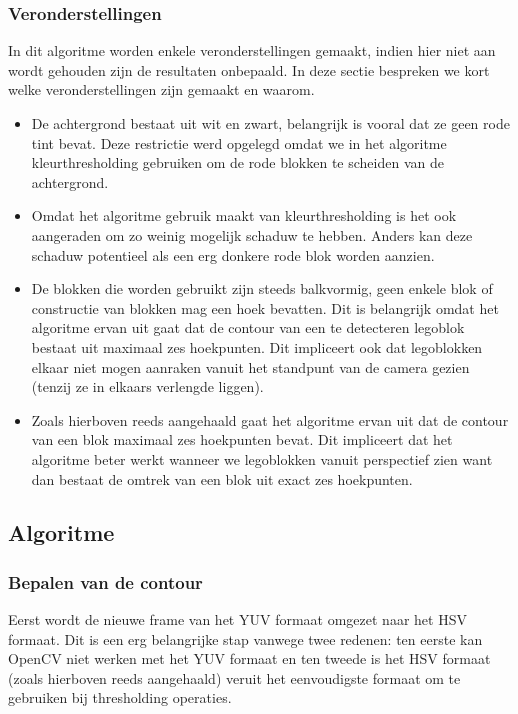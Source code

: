 \subsubsection*{Veronderstellingen}
In dit algoritme worden enkele veronderstellingen gemaakt, indien hier niet aan wordt gehouden zijn de resultaten onbepaald. In deze sectie bespreken we kort welke veronderstellingen zijn gemaakt en waarom.

\begin{itemize}
\item De achtergrond bestaat uit wit en zwart, belangrijk is vooral dat ze geen rode tint bevat. Deze restrictie werd opgelegd omdat we in het algoritme kleurthresholding gebruiken om de rode blokken te scheiden van de achtergrond.
\item Omdat het algoritme gebruik maakt van kleurthresholding is het ook aangeraden om zo weinig mogelijk schaduw te hebben. Anders kan deze schaduw potentieel als een erg donkere rode blok worden aanzien. 
\item De blokken die worden gebruikt zijn steeds balkvormig, geen enkele blok of constructie van blokken mag een hoek bevatten. Dit is belangrijk omdat het algoritme ervan uit gaat dat de contour van een te detecteren legoblok bestaat uit maximaal zes hoekpunten. Dit impliceert ook dat legoblokken elkaar niet mogen aanraken vanuit het standpunt van de camera gezien (tenzij ze in elkaars verlengde liggen).
\item Zoals hierboven reeds aangehaald gaat het algoritme ervan uit dat de contour van een blok maximaal zes hoekpunten bevat. Dit impliceert dat het algoritme beter werkt wanneer we legoblokken vanuit perspectief zien want dan bestaat de omtrek van een blok uit exact zes hoekpunten.
\end{itemize}

\subsection{Algoritme}

\subsubsection*{Bepalen van de contour}

Eerst wordt de nieuwe frame van het YUV formaat omgezet naar het HSV formaat. Dit is een erg belangrijke stap vanwege twee redenen: ten eerste kan OpenCV niet werken met het YUV formaat en ten tweede is het HSV formaat (zoals hierboven reeds aangehaald) veruit het eenvoudigste formaat om te gebruiken bij thresholding operaties.

